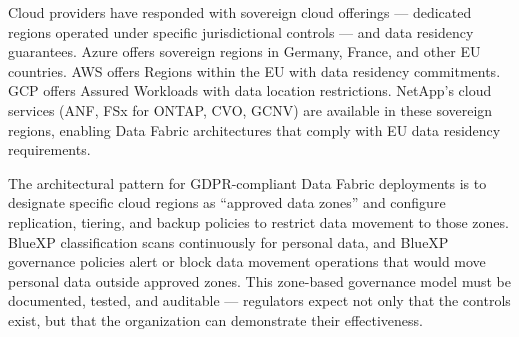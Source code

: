 Cloud providers have responded with sovereign cloud offerings --- dedicated
regions operated under specific jurisdictional controls --- and data residency
guarantees. Azure offers sovereign regions in Germany, France, and other EU
countries. AWS offers Regions within the EU with data residency commitments.
GCP offers Assured Workloads with data location restrictions. NetApp's cloud
services (ANF, FSx for ONTAP, CVO, GCNV) are available in these sovereign
regions, enabling Data Fabric architectures that comply with EU data residency
requirements.

The architectural pattern for GDPR-compliant Data Fabric deployments is to
designate specific cloud regions as ``approved data zones'' and configure
replication, tiering, and backup policies to restrict data movement to those
zones. BlueXP classification scans continuously for personal data, and BlueXP
governance policies alert or block data movement operations that would move
personal data outside approved zones. This zone-based governance model must be
documented, tested, and auditable --- regulators expect not only that the
controls exist, but that the organization can demonstrate their effectiveness.

